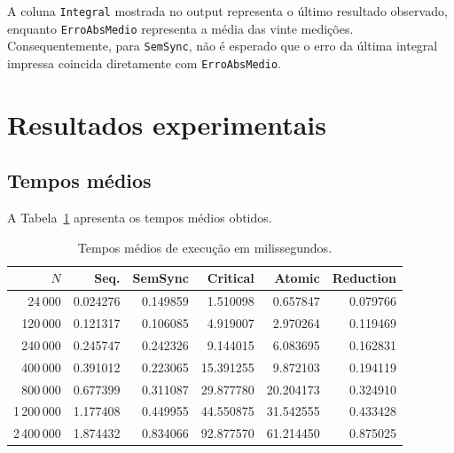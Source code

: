 A coluna \texttt{Integral} mostrada no output representa o último resultado
observado, enquanto \texttt{ErroAbsMedio} representa a média das vinte
medições. Consequentemente, para \texttt{SemSync}, não é esperado que o erro
da última integral impressa coincida diretamente com
\texttt{ErroAbsMedio}.


\section{Resultados experimentais}

\label{sec:atvd06-resultados}

\subsection{Tempos médios}

A Tabela~\ref{tab:atvd06-tempos} apresenta os tempos médios obtidos.

\begin{table}[htbp]
    \centering
    \caption{Tempos médios de execução em milissegundos.}
    \label{tab:atvd06-tempos}
    \scriptsize

    \begin{tabular}{r|r|r|r|r|r}
        \hline
        \(N\) &
        Seq. &
        SemSync &
        Critical &
        Atomic &
        Reduction \\
        \hline

        24\,000 &
        0.024276 &
        0.149859 &
        1.510098 &
        0.657847 &
        0.079766 \\

        120\,000 &
        0.121317 &
        0.106085 &
        4.919007 &
        2.970264 &
        0.119469 \\

        240\,000 &
        0.245747 &
        0.242326 &
        9.144015 &
        6.083695 &
        0.162831 \\

        400\,000 &
        0.391012 &
        0.223065 &
        15.391255 &
        9.872103 &
        0.194119 \\

        800\,000 &
        0.677399 &
        0.311087 &
        29.877780 &
        20.204173 &
        0.324910 \\

        1\,200\,000 &
        1.177408 &
        0.449955 &
        44.550875 &
        31.542555 &
        0.433428 \\

        2\,400\,000 &
        1.874432 &
        0.834066 &
        92.877570 &
        61.214450 &
        0.875025 \\
        \hline
    \end{tabular}
\end{table}


